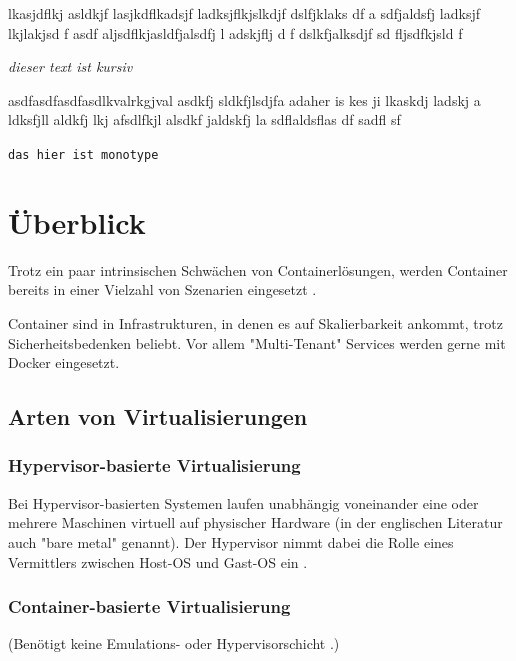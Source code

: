 \documentclass[11pt,a4paper,oneside]{report}
\begin{document}
lkasjdflkj asldkjf lasjkdflkadsjf ladksjflkjslkdjf    dslfjklaks df a sdfjaldsfj  ladksjf lkjlakjsd f asdf aljsdflkjasldfjalsdfj l adskjflj d f dslkfjalksdjf sd fljsdfkjsld f

\emph{dieser text ist kursiv}

asdfasdfasdfasdlkvalrkgjval  asdkfj  sldkfjlsdjfa adaher is kes ji lkaskdj ladskj a ldksfjll aldkfj lkj afsdlfkjl alsdkf jaldskfj la sdflaldsflas df sadfl sf

\texttt{das hier ist monotype}




\chapter{Überblick}

  Trotz ein paar intrinsischen Schwächen von Containerlösungen, werden Container bereits in einer Vielzahl von Szenarien eingesetzt \cite[S.6]{dockerBook}.

  Container sind in Infrastrukturen, in denen es auf Skalierbarkeit ankommt, trotz Sicherheitsbedenken beliebt. Vor allem "Multi-Tenant" Services werden gerne mit Docker eingesetzt.
	\section{Arten von Virtualisierungen}
    \subsection{Hypervisor-basierte Virtualisierung}
      Bei Hypervisor-basierten Systemen laufen unabhängig voneinander eine oder mehrere Maschinen virtuell auf physischer Hardware (in der englischen Literatur auch "bare metal" genannt). Der Hypervisor nimmt dabei die Rolle eines Vermittlers zwischen Host-OS und Gast-OS ein \cite[S.6]{dockerBook}.
    \subsection{Container-basierte Virtualisierung}
      (Benötigt keine Emulations- oder Hypervisorschicht \cite[S.7]{dockerBook}.)
\end{document}
